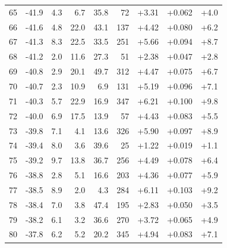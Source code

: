 \begin{longtable}{@{}r r r r r r r r r@{}}
65 & -41.9 & 4.3 & 6.7 & 35.8 & 72 & \cellcolor{green!41}+3.31 & \cellcolor{yellow!44}+0.062 & \cellcolor{orange!34}+4.0 \\
66 & -41.6 & 4.8 & 22.0 & 43.1 & 137 & \cellcolor{green!50}+4.42 & \cellcolor{yellow!53}+0.080 & \cellcolor{orange!45}+6.2 \\
67 & -41.3 & 8.3 & 22.5 & 33.5 & 251 & \cellcolor{green!60}+5.66 & \cellcolor{yellow!60}+0.094 & \cellcolor{orange!57}+8.7 \\
68 & -41.2 & 2.0 & 11.6 & 27.3 & 51 & \cellcolor{green!34}+2.38 & \cellcolor{yellow!37}+0.047 & \cellcolor{orange!29}+2.8 \\
69 & -40.8 & 2.9 & 20.1 & 49.7 & 312 & \cellcolor{green!51}+4.47 & \cellcolor{yellow!51}+0.075 & \cellcolor{orange!47}+6.7 \\
70 & -40.7 & 2.3 & 10.9 & 6.9 & 131 & \cellcolor{green!56}+5.19 & \cellcolor{yellow!61}+0.096 & \cellcolor{orange!49}+7.1 \\
71 & -40.3 & 5.7 & 22.9 & 16.9 & 347 & \cellcolor{green!64}+6.21 & \cellcolor{yellow!63}+0.100 & \cellcolor{orange!62}+9.8 \\
72 & -40.0 & 6.9 & 17.5 & 13.9 & 57 & \cellcolor{green!50}+4.43 & \cellcolor{yellow!55}+0.083 & \cellcolor{orange!42}+5.5 \\
73 & -39.8 & 7.1 & 4.1 & 13.6 & 326 & \cellcolor{green!62}+5.90 & \cellcolor{yellow!61}+0.097 & \cellcolor{orange!58}+8.9 \\
74 & -39.4 & 8.0 & 3.6 & 39.6 & 25 & \cellcolor{green!25}+1.22 & \cellcolor{yellow!24}+0.019 & \cellcolor{orange!20}+1.1 \\
75 & -39.2 & 9.7 & 13.8 & 36.7 & 256 & \cellcolor{green!51}+4.49 & \cellcolor{yellow!52}+0.078 & \cellcolor{orange!46}+6.4 \\
76 & -38.8 & 2.8 & 5.1 & 16.6 & 203 & \cellcolor{green!50}+4.36 & \cellcolor{yellow!52}+0.077 & \cellcolor{orange!43}+5.9 \\
77 & -38.5 & 8.9 & 2.0 & 4.3 & 284 & \cellcolor{green!63}+6.11 & \cellcolor{yellow!65}+0.103 & \cellcolor{orange!59}+9.2 \\
78 & -38.4 & 7.0 & 3.8 & 47.4 & 195 & \cellcolor{green!38}+2.83 & \cellcolor{yellow!39}+0.050 & \cellcolor{orange!32}+3.5 \\
79 & -38.2 & 6.1 & 3.2 & 36.6 & 270 & \cellcolor{green!45}+3.72 & \cellcolor{yellow!46}+0.065 & \cellcolor{orange!39}+4.9 \\
80 & -37.8 & 6.2 & 5.2 & 20.2 & 345 & \cellcolor{green!54}+4.94 & \cellcolor{yellow!55}+0.083 & \cellcolor{orange!49}+7.1 \\

\end{longtable}
